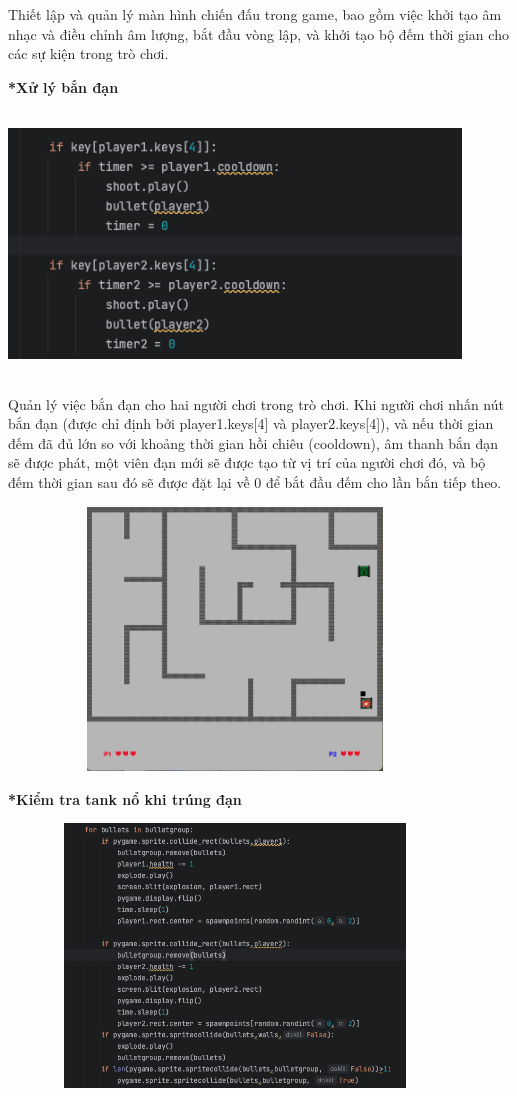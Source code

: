 \documentclass[a4paper]{article}
\begin{document}
         Thiết lập và quản lý màn hình chiến đấu trong game, bao gồm việc khởi tạo âm nhạc và điều chỉnh âm lượng, bắt đầu vòng lập, và khởi tạo bộ đếm thời gian cho các sự kiện trong trò chơi.

        \textbf{*Xử lý bắn đạn }
        
        \includegraphics[width=12cm,height=7cm]{firetank.png}

        Quản lý việc bắn đạn cho hai người chơi trong trò chơi. Khi người chơi nhấn nút bắn đạn (được chỉ định bởi player1.keys[4] và player2.keys[4]), và nếu thời gian đếm đã đủ lớn so với khoảng thời gian hồi chiêu (cooldown), âm thanh bắn đạn sẽ được phát, một viên đạn mới sẽ được tạo từ vị trí của người chơi đó, và bộ đếm thời gian sau đó sẽ được đặt lại về 0 để bắt đầu đếm cho lần bắn tiếp theo.

         \includegraphics[width=12cm,height=7cm]{imgfiretank2.png}

        \textbf{*Kiểm tra tank nổ khi trúng đạn }
        
        \includegraphics[width=12cm,height=7cm]{wartank.png}
\end{document}
